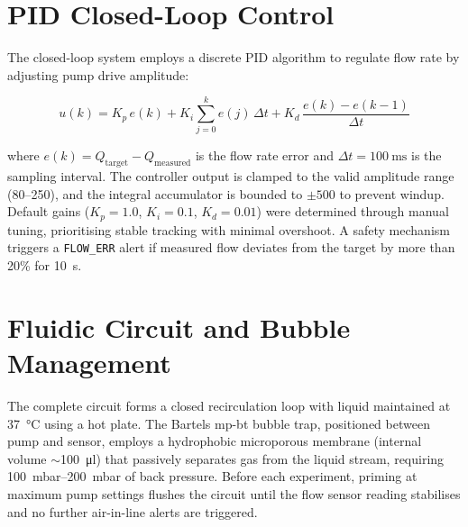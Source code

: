 \section{PID Closed-Loop Control}

The closed-loop system employs a discrete PID algorithm to regulate flow rate by adjusting pump drive amplitude:

\begin{equation}
    u(k) = K_p \, e(k) + K_i \sum_{j=0}^{k} e(j) \, \Delta t + K_d \, \frac{e(k) - e(k-1)}{\Delta t}
    \label{eq:pid}
\end{equation}

\noindent where $e(k) = Q_{\text{target}} - Q_{\text{measured}}$ is the flow rate error and $\Delta t = \SI{100}{\milli\second}$ is the sampling interval. The controller output is clamped to the valid amplitude range (80--250), and the integral accumulator is bounded to $\pm 500$ to prevent windup. Default gains ($K_p = 1.0$, $K_i = 0.1$, $K_d = 0.01$) were determined through manual tuning, prioritising stable tracking with minimal overshoot. A safety mechanism triggers a \texttt{FLOW\_ERR} alert if measured flow deviates from the target by more than 20\% for \SI{10}{\second}.

\section{Fluidic Circuit and Bubble Management}

The complete circuit forms a closed recirculation loop with liquid maintained at \SI{37}{\celsius} using a hot plate. The Bartels mp-bt bubble trap, positioned between pump and sensor, employs a hydrophobic microporous membrane (internal volume $\sim$\SI{100}{\micro\litre}) that passively separates gas from the liquid stream, requiring \SIrange{100}{200}{\milli\bar} of back pressure. Before each experiment, priming at maximum pump settings flushes the circuit until the flow sensor reading stabilises and no further air-in-line alerts are triggered.
